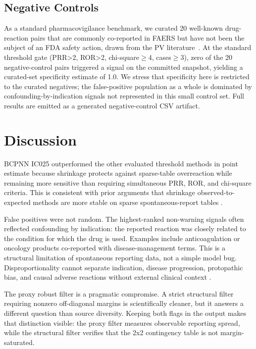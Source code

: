 \documentclass[12pt,onecolumn]{IEEEtran}
\begin{document}
\subsection{Negative Controls}
\label{sec:negcontrols}
As a standard pharmacovigilance benchmark, we curated 20 well-known
drug-reaction pairs that are commonly co-reported in FAERS but have not been
the subject of an FDA safety action, drawn from the PV
literature~\cite{harpaz2012novel}. At the standard threshold
gate (PRR>2, ROR>2, chi-square$\geq$4, cases$\geq$3), zero of the 20
negative-control pairs triggered a signal on the committed snapshot,
yielding a curated-set specificity estimate of 1.0. We stress that
specificity here is restricted to the curated negatives; the false-positive
population as a whole is dominated by confounding-by-indication signals not
represented in this small control set. Full results are emitted as a generated
negative-control CSV artifact.

\section{Discussion}
BCPNN IC025 outperformed the other evaluated threshold methods in point
estimate because shrinkage protects against sparse-table overreaction while
remaining more sensitive than requiring simultaneous PRR, ROR, and chi-square
criteria. This is consistent with prior arguments that shrinkage
observed-to-expected methods are more stable on sparse spontaneous-report
tables \cite{bate1998bcpnn,noren2013shrinkage}.

False positives were not random. The highest-ranked non-warning signals often
reflected confounding by indication: the reported reaction was closely related
to the condition for which the drug is used. Examples include anticoagulation
or oncology products co-reported with disease-management terms. This is a
structural limitation of spontaneous reporting data, not a simple model bug.
Disproportionality cannot separate indication, disease progression,
protopathic bias, and causal adverse reactions without external clinical
context \cite{salas1999confounding,salvo2013signal}.

The proxy robust filter is a pragmatic compromise. A strict structural filter
requiring nonzero off-diagonal margins is scientifically cleaner, but it answers
a different question than source diversity. Keeping both flags in the output
makes that distinction visible: the proxy filter measures observable reporting
spread, while the structural filter verifies that the 2x2 contingency table is
not margin-saturated.
\end{document}
